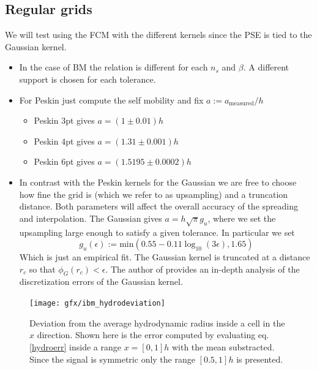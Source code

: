 \documentclass[ twoside,openright,titlepage,numbers=noenddot,%
headinclude,footinclude,cleardoublepage=empty,abstract=on,
BCOR=5mm,paper=a4,fontsize=11pt, dvipsnames
]{scrreprt}
\begin{document}
\subsection*{Regular grids}
We will test using the \gls{FCM} with the different kernels since the \gls{PSE} is tied to the Gaussian kernel.

\begin{itemize}
\item In the case of BM the relation is different for each $n_s$ and $\beta$. A different support is chosen for each tolerance.
\item For Peskin just compute the self mobility and fix $a := a_{\text{measured}}/h$
  \begin{itemize}
  \item Peskin 3pt gives $a=(1\pm 0.01) h$
  \item Peskin 4pt gives $a=(1.31\pm 0.001) h$
  \item Peskin 6pt gives $a=(1.5195 \pm 0.0002) h$
  \end{itemize}
\item In contrast with the Peskin kernels for the Gaussian we are free to choose how fine the grid is (which we refer to as upsampling) and a truncation distance. Both parameters will affect the overall accuracy of the spreading and interpolation. The Gaussian gives $a=h \sqrt{\pi} g_u$, where we set the upsampling large enough to satisfy a given tolerance. In particular we set
  \begin{equation}
    g_u(\epsilon) := \text{min}\left(0.55 -0.11 \log_{10}(3\epsilon), 1.65\right)
  \end{equation}
  Which is just an empirical fit.
  The Gaussian kernel is truncated at a distance $r_c$ so that $\phi_G(r_c) < \epsilon$. The author of \cite{Keaveny2014} provides an in-depth analysis of the discretization errors of the Gaussian kernel.
\end{itemize}

\begin{figure}
\label{fig:ibm_hydrovar}
\texttt{[image: gfx/ibm\_hydrodeviation]}  
  \caption{Deviation from the average hydrodynamic radius inside a cell in the $x$ direction. Shown here is the error computed by evaluating eq. \eqref{hydroerr} inside a range $x=[0, 1]h$ with the mean substracted. Since the signal is symmetric only the range $[0.5, 1]h$ is presented.}
\end{figure}
\end{document}
